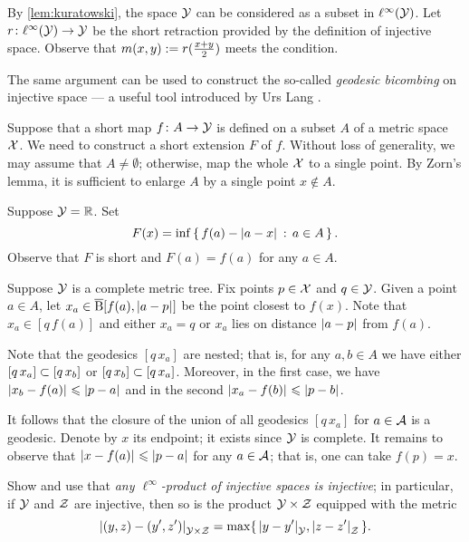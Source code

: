 By \ref{lem:kuratowski}, the space $\mathcal{Y}$ can be considered as a subset in $\ell^\infty(\mathcal{Y})$.
Let $r\colon \ell^\infty(\mathcal{Y})\to \mathcal{Y}$ be the short retraction provided by the definition of injective space.
Observe that $m(x,y)\mathrel{:=} r(\tfrac{x+y}2)$ meets the condition.

 The same argument can be used to construct the so-called \emph{geodesic bicombing} on injective space --- a useful tool introduced by Urs Lang \cite[3.6]{lang-2013}.

Suppose that a short map $f\colon A\to\mathcal{Y}$ is defined on a subset $A$ of a metric space $\mathcal{X}$.
We need to construct a short extension $F$ of $f$.
Without loss of generality, we may assume that $A\ne\emptyset$;
otherwise, map the whole $\mathcal{X}$ to a single point.
By Zorn's lemma, it is sufficient to enlarge $A$ by a single point $x\notin A$.

Suppose $\mathcal{Y}=\mathbb{R}$.
Set 
\[F(x)=\inf\set{f(a)-\dist{a}{x}{}}{a\in A}.\] 
Observe that $F$ is short and $F(a)=f(a)$ for any $a\in A$.

Suppose  $\mathcal{Y}$ is a complete metric tree.
Fix points $p\in \mathcal{X}$ and $q\in\mathcal{Y}$.
Given a point $a\in A$,
let $x_a\in\cBall[f(a),\dist{a}{p}{}]$ be the point closest to $f(x)$.
Note that $x_a\in[q\,f(a)]$ and either $x_a=q$ or $x_a$ lies on distance $\dist{a}{p}{}$ from $f(a)$.

Note that the geodesics $[q\,x_a]$ are nested;
that is, for any $a,b\in A$ we have either $[q\,x_a]\z\subset [q\,x_b]$ or $[q\,x_b]\z\subset [q\,x_a]$.
Moreover, in the first case, we have $\dist{x_b}{f(a)}{}\le \dist{p}{a}{}$ and in the second $\dist{x_a}{f(b)}{}\le \dist{p}{b}{}$.

It follows that the closure of the union of all geodesics $[q\,x_a]$ for $a\in\mathcal{A}$ is a geodesic.
Denote by $x$ its endpoint; it exists since $\mathcal{Y}$ is complete.
It remains to observe that $\dist{x}{f(a)}{}\le \dist{p}{a}{}$ for any $a\in\mathcal{A}$;
that is, one can take $f(p)=x$.

Show and use that \textit{any $\ell^\infty$-product of injective spaces is injective};
in particular, if $\mathcal{Y}$ and $\mathcal{Z}$ are injective, then so is the product $\mathcal{Y}\times\mathcal{Z}$ equipped with the metric 
\[\dist{(y,z)}{(y',z')}{\spc{Y}\times\spc{Z}}=\max\{\,\dist{y}{y'}{\spc{Y}},\dist{z}{z'}{\spc{Z}}\,\}.\]

